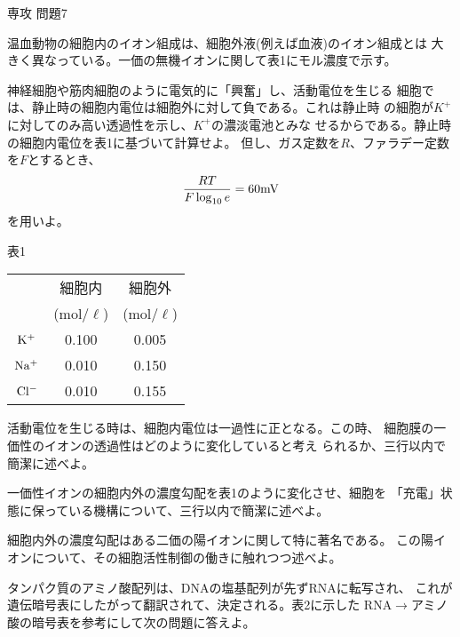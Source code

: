 \documentclass[fleqn]{jbook}
\begin{document}
\begin{question}{専攻 問題7}{}

\begin{subquestions}
\SubQuestion

  温血動物の細胞内のイオン組成は、細胞外液(例えば血液)のイオン組成とは
  大きく異なっている。一価の無機イオンに関して表1にモル濃度で示す。

  \begin{subsubquestions}
  \SubSubQuestion
  \parbox[t]{102mm}{
    神経細胞や筋肉細胞のように電気的に「興奮」し、活動電位を生じる
    細胞では、静止時の細胞内電位は細胞外に対して負である。これは静止時
    の細胞が$K^+$に対してのみ高い透過性を示し、$K^+$の濃淡電池とみな
    せるからである。静止時の細胞内電位を表1に基づいて計算せよ。
    但し、ガス定数を$R$、ファラデー定数を$F$とするとき、
%
    \[ \frac{RT}{F\log_{10}e}=60{\rm mV}\]
%
    を用いよ。

  }\parbox[t]{50mm}{\vspace*{-5mm}
  \begin{center}
    表1\\\begin{tabular}{|c|c|c|}\hline
      &細胞内&細胞外 \\ 
      &(mol/$\ell$)&(mol/$\ell$) \\ \hline
      $\rm K^+$ & 0.100 & 0.005 \\
      $\rm Na^+$&0.010& 0.150 \\
      $\rm Cl^-$&0.010&0.155 \\ \hline
    \end{tabular}
  \end{center}}

  \SubSubQuestion
    活動電位を生じる時は、細胞内電位は一過性に正となる。この時、
    細胞膜の一価性のイオンの透過性はどのように変化していると考え
    られるか、三行以内で簡潔に述べよ。

  \SubSubQuestion
    一価性イオンの細胞内外の濃度勾配を表1のように変化させ、細胞を
    「充電」状態に保っている機構について、三行以内で簡潔に述べよ。

  \SubSubQuestion
    細胞内外の濃度勾配はある二価の陽イオンに関して特に著名である。
    この陽イオンについて、その細胞活性制御の働きに触れつつ述べよ。

  \end{subsubquestions}

\SubQuestion
  タンパク質のアミノ酸配列は、DNAの塩基配列が先ずRNAに転写され、
  これが遺伝暗号表にしたがって翻訳されて、決定される。表2に示した
  RNA$\rightarrow$アミノ酸の暗号表を参考にして次の問題に答えよ。


\end{subquestions}
\end{question}
\end{document}
